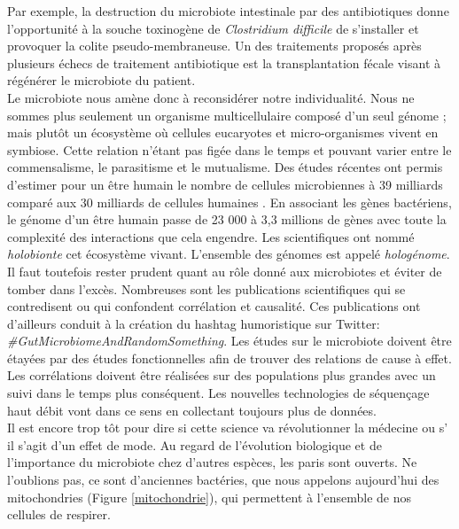 \documentclass[12pt,a4paper]{article}
\begin{document}
Par exemple, la destruction du microbiote intestinale par des antibiotiques donne l'opportunité à la souche toxinogène de \textit{Clostridium difficile} de s'installer et provoquer la colite pseudo-membraneuse. Un des traitements proposés après plusieurs échecs de traitement antibiotique est la transplantation fécale visant à régénérer le microbiote du patient. \\
Le microbiote nous amène donc à reconsidérer notre individualité. Nous ne sommes plus seulement un organisme multicellulaire composé d'un seul génome ; mais plutôt un écosystème où cellules eucaryotes et micro-organismes vivent en symbiose. Cette relation n'étant pas figée dans le temps et pouvant varier entre le commensalisme, le parasitisme et le mutualisme. Des études récentes ont permis d'estimer pour un être humain le nombre  de cellules microbiennes à 39 milliards comparé aux 30 milliards de cellules humaines \cite{Sender2016}. En associant les gènes bactériens, le génome d’un être humain passe de 23 000  à 3,3 millions de gènes \cite{Qin2010} avec toute la complexité des interactions que cela engendre. Les scientifiques ont nommé \textit{holobionte} cet écosystème vivant. L'ensemble des génomes est appelé \textit{hologénome}. \\
Il faut toutefois rester prudent quant au rôle donné aux microbiotes et éviter de tomber dans l'excès. Nombreuses sont les publications scientifiques qui se contredisent ou qui confondent corrélation et causalité. Ces publications ont d'ailleurs conduit à la création du hashtag humoristique sur Twitter: \textit{\#GutMicrobiomeAndRandomSomething}. 
Les études sur le microbiote doivent être étayées par des études fonctionnelles afin de trouver des relations de cause à effet. Les corrélations doivent être réalisées sur des populations plus grandes avec un suivi dans le temps plus conséquent. Les nouvelles technologies de séquençage haut débit vont dans ce sens en collectant toujours plus de données.\\
Il est encore trop tôt pour dire si cette science va révolutionner la médecine ou s’ il s'agit d'un effet de mode. Au regard de l'évolution biologique et de l'importance du microbiote chez d'autres espèces, les paris sont ouverts. Ne l'oublions pas, ce sont d'anciennes bactéries, que nous appelons aujourd'hui des mitochondries (Figure \ref{mitochondrie}), qui permettent à l'ensemble de nos cellules de respirer. 
\end{document}
